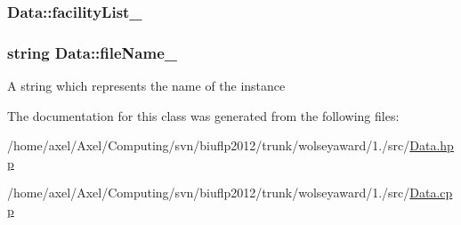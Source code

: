 \hypertarget{classData_a32e37fbe47067762b6412955f8670ba5}{
\subsubsection[{facility\-List\-\_\-}]{ {\bf \-Data\-::facility\-List\-\_\-}}}\label{classData_a32e37fbe47067762b6412955f8670ba5}
\hypertarget{classData_ab7f03877c05f051285208059a6be5c69}{
\subsubsection[{file\-Name\-\_\-}]{\setlength{\rightskip}{0pt plus 5cm}string {\bf \-Data\-::file\-Name\-\_\-}}}\label{classData_ab7f03877c05f051285208059a6be5c69}
\-A string which represents the name of the instance 

\-The documentation for this class was generated from the following files\-:\begin{DoxyCompactItemize}
\item 
/home/axel/\-Axel/\-Computing/svn/biuflp2012/trunk/wolseyaward/1./src/\hyperlink{Data_8hpp}{\-Data.\-hpp}\item 
/home/axel/\-Axel/\-Computing/svn/biuflp2012/trunk/wolseyaward/1./src/\hyperlink{Data_8cpp}{\-Data.\-cpp}\end{DoxyCompactItemize}

